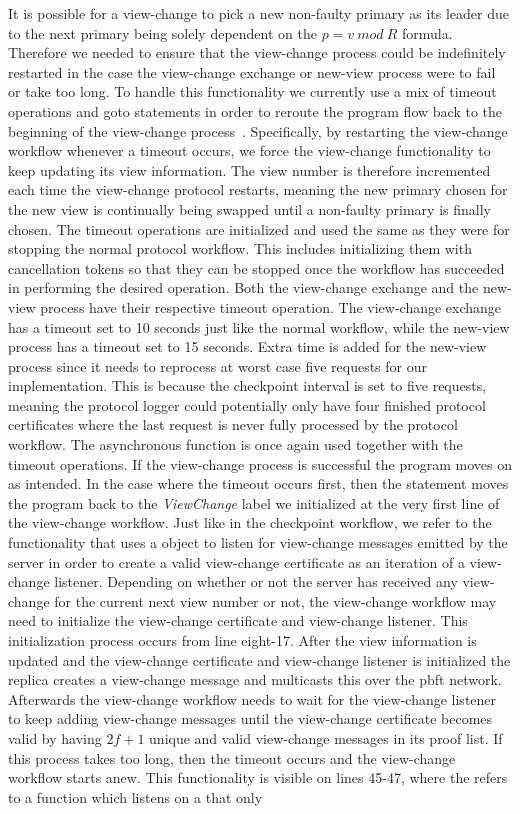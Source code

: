 It is possible for a view-change to pick a new non-faulty primary as its leader due to the next primary being solely dependent on the $p = v ~mod~ R$ formula. Therefore we needed to ensure that the view-change process could be indefinitely restarted in the case the view-change exchange or new-view process were to fail or take too long. To handle this functionality we currently use a mix of timeout operations and goto statements in order to reroute the program flow back to the beginning of the view-change process~\cite{WEB:goto}. Specifically, by restarting the view-change workflow whenever a timeout occurs, we force the view-change functionality to keep updating its view information. The view number is therefore incremented each time the view-change protocol restarts, meaning the new primary chosen for the new view is continually being swapped until a non-faulty primary is finally chosen. The timeout operations are initialized and used the same as they were for stopping the normal protocol workflow. This includes initializing them with cancellation tokens so that they can be stopped once the workflow has succeeded in performing the desired operation. Both the view-change exchange and the new-view process have their respective timeout operation. The view-change exchange has a timeout set to 10 seconds just like the normal workflow, while the new-view process has a timeout set to 15 seconds. Extra time is added for the new-view process since it needs to reprocess at worst case five requests for our implementation. This is because the checkpoint interval is set to five requests, meaning the protocol logger could potentially only have four finished protocol certificates where the last request is never fully processed by the protocol workflow.  The  asynchronous function is once again used together with the timeout operations. If the view-change process is successful the program moves on as intended. In the case where the timeout occurs first, then the  statement moves the program back to the \emph{ViewChange} label we initialized at the very first line of the view-change workflow. Just like in the checkpoint workflow, we refer to the functionality that uses a  object to listen for view-change messages emitted by the server in order to create a valid view-change certificate as an iteration of a view-change listener. Depending on whether or not the server has received any view-change for the current next view number or not, the view-change workflow may need to initialize the view-change certificate and view-change listener. This initialization process occurs from line eight-17. After the view information is updated and the view-change certificate and view-change listener is initialized the replica creates a view-change message and multicasts this over the \ac{pbft} network. Afterwards the view-change workflow needs to wait for the view-change listener to keep adding view-change messages until the view-change certificate becomes valid by having $2f+1$ unique and valid view-change messages in its proof list. If this process takes too long, then the timeout occurs and the view-change workflow starts anew. This functionality is visible on lines 45-47, where the  refers to a function which listens on a  that only 